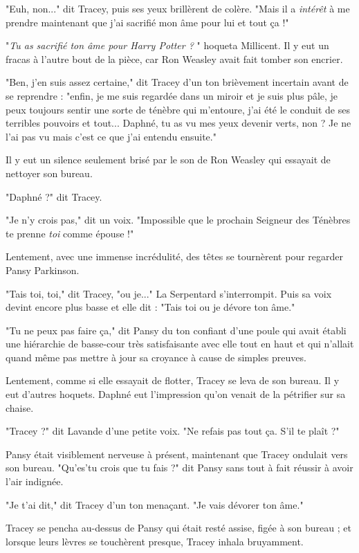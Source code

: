 "Euh, non..." dit Tracey, puis ses yeux brillèrent de colère. "Mais il a \emph{intérêt}  à me prendre maintenant que j'ai sacrifié mon âme pour lui et tout ça !"

"\emph{Tu as sacrifié ton âme pour Harry Potter ?} " hoqueta Millicent. Il y eut un fracas à l'autre bout de la pièce, car Ron Weasley avait fait tomber son encrier.

"Ben, j'en suis assez certaine," dit Tracey d'un ton brièvement incertain avant de se reprendre : "enfin, je me suis regardée dans un miroir et je suis plus pâle, je peux toujours sentir une sorte de ténèbre qui m'entoure, j'ai été le conduit de ses terribles pouvoirs et tout... Daphné, tu as vu mes yeux devenir verts, non ? Je ne l'ai pas vu mais c'est ce que j'ai entendu ensuite."

Il y eut un silence seulement brisé par le son de Ron Weasley qui essayait de nettoyer son bureau.

"Daphné ?" dit Tracey.

"Je n'y crois pas," dit un voix. "Impossible que le prochain Seigneur des Ténèbres te prenne \emph{toi}  comme épouse !"

Lentement, avec une immense incrédulité, des têtes se tournèrent pour regarder Pansy Parkinson.

"Tais toi, toi," dit Tracey, "ou je..." La Serpentard s'interrompit. Puis sa voix devint encore plus basse et elle dit : "Tais toi ou je dévore ton âme."

"Tu ne peux pas faire ça," dit Pansy du ton confiant d'une poule qui avait établi une hiérarchie de basse-cour très satisfaisante avec elle tout en haut et qui n'allait quand même pas mettre à jour sa croyance à cause de simples preuves.

Lentement, comme si elle essayait de flotter, Tracey se leva de son bureau. Il y eut d'autres hoquets. Daphné eut l'impression qu'on venait de la pétrifier sur sa chaise.

"Tracey ?" dit Lavande d'une petite voix. "Ne refais pas tout ça. S'il te plaît ?"

Pansy était visiblement nerveuse à présent, maintenant que Tracey ondulait vers son bureau. "Qu'es'tu crois que tu fais ?" dit Pansy sans tout à fait réussir à avoir l'air indignée.

"Je t'ai dit," dit Tracey d'un ton menaçant. "Je vais dévorer ton âme."

Tracey se pencha au-dessus de Pansy qui était resté assise, figée à son bureau ; et lorsque leurs lèvres se touchèrent presque, Tracey inhala bruyamment.

